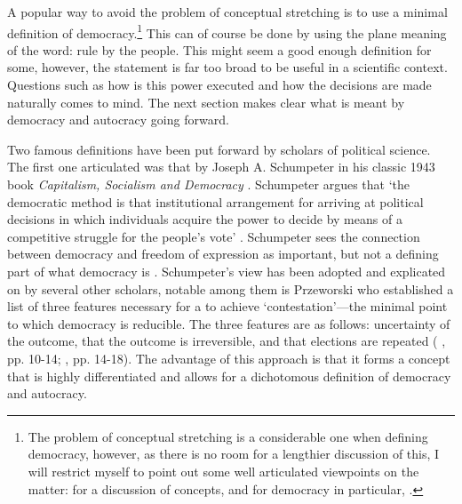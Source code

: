 A popular way to avoid the problem of conceptual stretching is to use a minimal definition of democracy.\footnote{The problem of conceptual stretching is a considerable one when defining democracy, however, as there is no room for a lengthier discussion of this, I will restrict myself to point out some well articulated viewpoints on the matter: \citealp[see:][]{sartori_concept_1970, collier_conceptual_1993} for a discussion of concepts, and for democracy in particular, \citealp[see:][]{collier_democracy_1997}.} This can of course be done by using the plane meaning of the word: rule by the people. This might seem a good enough definition for some, however, the statement is far too broad to be useful in a scientific context. Questions such as how is this power executed and how the decisions are made naturally comes to mind. The next section makes clear what is meant by democracy and autocracy going forward.

Two famous definitions have been put forward by scholars of political science. The first one articulated was that by Joseph A. Schumpeter in his classic 1943 book \textit{Capitalism, Socialism and Democracy} \citeyearpar{schumpeter_capitalism_2010}.  Schumpeter argues that `the democratic method is that institutional arrangement for arriving at political decisions in which individuals acquire the power to decide by means of a competitive struggle for the people’s vote' \citep[p. 241]{schumpeter_capitalism_2010}. Schumpeter sees the connection between democracy and freedom of expression as important, but not a defining part of what democracy is \citep[pp. 243-244]{schumpeter_capitalism_2010}. Schumpeter's view has been adopted and explicated on by several other scholars, notable among them is Przeworski who established a list of three features necessary for a to achieve `contestation'---the minimal point to which democracy is reducible. The three features are as follows: uncertainty of the outcome, that the outcome is irreversible, and that elections are repeated (\citeauthor{przeworski_democracy_1991} \citeyear{przeworski_democracy_1991}, pp. 10-14; \citeauthor{przeworski_modernization_1997} \citeyear{przeworski_modernization_1997}, pp. 14-18). The advantage of this approach is that it forms a concept that is highly differentiated and allows for a dichotomous definition of democracy and autocracy. 


